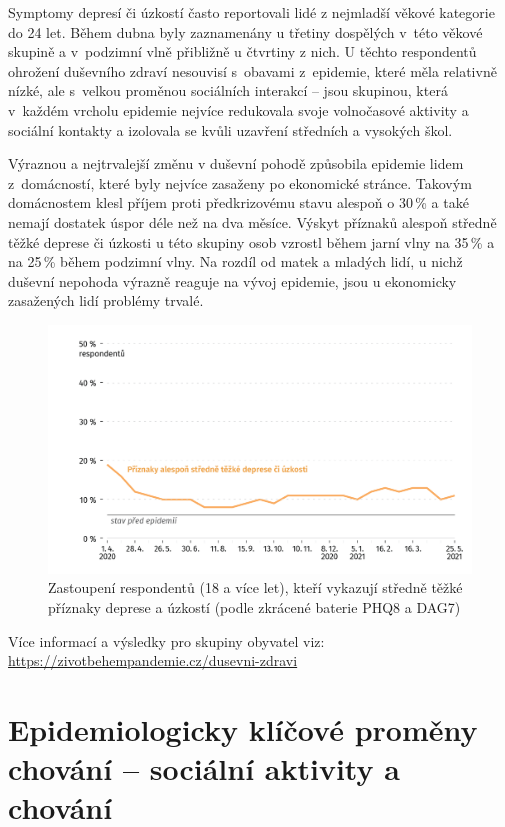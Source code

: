 Symptomy depresí či úzkostí často reportovali lidé z nejmladší věkové kategorie do 24 let. Během dubna byly zaznamenány u třetiny dospělých v této věkové skupině a v podzimní vlně přibližně u čtvrtiny z nich. U těchto respondentů ohrožení duševního zdraví nesouvisí s obavami z epidemie, které měla relativně nízké, ale s velkou proměnou sociálních interakcí – jsou skupinou, která v každém vrcholu epidemie nejvíce redukovala svoje volnočasové aktivity a sociální kontakty a izolovala se kvůli uzavření středních a vysokých škol.

Výraznou a nejtrvalejší změnu v duševní pohodě způsobila epidemie lidem z domácností, které byly nejvíce zasaženy po ekonomické stránce. Takovým domácnostem klesl příjem proti předkrizovému stavu alespoň o 30\,\% a také nemají dostatek úspor déle než na dva měsíce. Výskyt příznaků alespoň středně těžké deprese či úzkosti u této skupiny osob vzrostl během jarní vlny na 35\,\% a na 25\,\% během podzimní vlny. Na rozdíl od matek a mladých lidí, u nichž duševní nepohoda výrazně reaguje na vývoj epidemie, jsou u ekonomicky zasažených lidí problémy trvalé.


\begin{figure}[ht]
    \centering
    \includegraphics[width=\textwidth]{./pic/zbp-graf2.png}
    \caption{Zastoupení respondentů (18 a více let), kteří vykazují středně těžké příznaky deprese a úzkostí (podle zkrácené baterie PHQ8 a DAG7)}
    \label{fig:zbp2}
\end{figure}

Více informací a výsledky pro skupiny obyvatel viz: \url{https://zivotbehempandemie.cz/dusevni-zdravi}


\section*{Epidemiologicky klíčové proměny chování – sociální aktivity a chování}
\label{Epidemi_promeny}

